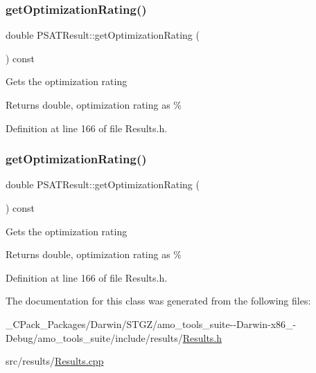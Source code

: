 \subsubsection{\texorpdfstring{get\+Optimization\+Rating()}{getOptimizationRating()}\hspace{0.1cm}{\footnotesize\ttfamily [2/3]}}
{\footnotesize\ttfamily double P\+S\+A\+T\+Result\+::get\+Optimization\+Rating (\begin{DoxyParamCaption}{ }\end{DoxyParamCaption}) const\hspace{0.3cm}{\ttfamily [inline]}}

Gets the optimization rating \begin{DoxyReturn}{Returns}
double, optimization rating as \% 
\end{DoxyReturn}


Definition at line 166 of file Results.\+h.

\mbox{\label{class_p_s_a_t_result_aa0a7001461408fcb06a6c22ce2d064db}} 
\subsubsection{\texorpdfstring{get\+Optimization\+Rating()}{getOptimizationRating()}\hspace{0.1cm}{\footnotesize\ttfamily [3/3]}}
{\footnotesize\ttfamily double P\+S\+A\+T\+Result\+::get\+Optimization\+Rating (\begin{DoxyParamCaption}{ }\end{DoxyParamCaption}) const\hspace{0.3cm}{\ttfamily [inline]}}

Gets the optimization rating \begin{DoxyReturn}{Returns}
double, optimization rating as \% 
\end{DoxyReturn}


Definition at line 166 of file Results.\+h.



The documentation for this class was generated from the following files\+:\begin{DoxyCompactItemize}
\item 
\+\_\+\+C\+Pack\+\_\+\+Packages/\+Darwin/\+S\+T\+G\+Z/amo\+\_\+tools\+\_\+suite-\/-\/\+Darwin-\/x86\+\_-\/\+Debug/amo\+\_\+tools\+\_\+suite/include/results/\hyperlink{___c_pack___packages_2_darwin_2_s_t_g_z_2amo__tools__suite--_darwin-x86__64-_debug_2amo__tools__c61f89930adec91d85dee64787ce69a0}{Results.\+h}\item 
src/results/\hyperlink{_results_8cpp}{Results.\+cpp}\end{DoxyCompactItemize}
